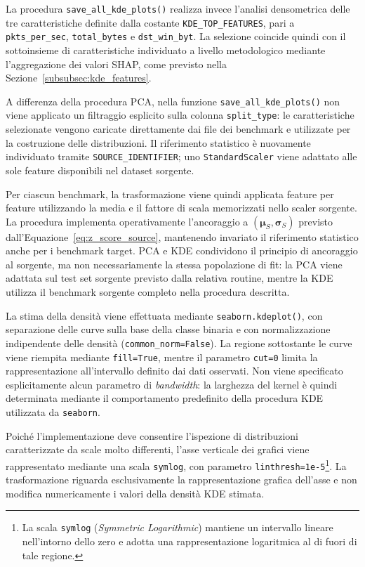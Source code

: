 La procedura \texttt{save\_all\_kde\_plots()} realizza invece l'analisi densometrica delle tre caratteristiche definite dalla costante \texttt{KDE\_TOP\_FEATURES}, pari a \texttt{pkts\_per\_sec}, \texttt{total\_bytes} e \texttt{dst\_win\_byt}. 
La selezione coincide quindi con il sottoinsieme di caratteristiche individuato a livello metodologico mediante l'aggregazione dei valori SHAP, come previsto nella Sezione~\ref{subsubsec:kde_features}.

A differenza della procedura PCA, nella funzione \texttt{save\_all\_kde\_plots()} non viene applicato un filtraggio esplicito sulla colonna \texttt{split\_type}: le caratteristiche selezionate vengono caricate direttamente dai file dei benchmark e utilizzate per la costruzione delle distribuzioni. 
Il riferimento statistico è nuovamente individuato tramite \texttt{SOURCE\_IDENTIFIER}; uno \texttt{StandardScaler} viene adattato alle sole feature disponibili nel dataset sorgente.

Per ciascun benchmark, la trasformazione viene quindi applicata feature per feature utilizzando la media e il fattore di scala memorizzati nello scaler sorgente. 
La procedura implementa operativamente l'ancoraggio a $(\boldsymbol{\mu}_S,\boldsymbol{\sigma}_S)$ previsto dall'Equazione~\eqref{eq:z_score_source}, mantenendo invariato il riferimento statistico anche per i benchmark target. PCA e KDE condividono il principio di ancoraggio al sorgente, ma non necessariamente la stessa popolazione di fit: la PCA viene adattata sul test set sorgente previsto dalla relativa routine, mentre la KDE utilizza il benchmark sorgente completo nella procedura descritta.

La stima della densità viene effettuata mediante \texttt{seaborn.kdeplot()}, con separazione delle curve sulla base della classe binaria e con normalizzazione indipendente delle densità \newline (\texttt{common\_norm=False}). 
La regione sottostante le curve viene riempita mediante \texttt{fill=True}, mentre il parametro \texttt{cut=0} limita la rappresentazione all'intervallo definito dai dati osservati. Non viene specificato esplicitamente alcun parametro di \textit{bandwidth}: la larghezza del kernel è quindi determinata mediante il comportamento predefinito della procedura KDE utilizzata da \texttt{seaborn}.

Poiché l'implementazione deve consentire l'ispezione di distribuzioni caratterizzate da scale molto differenti, l'asse verticale dei grafici viene rappresentato mediante una scala \texttt{symlog}, con parametro \texttt{linthresh=1e-5}\footnote{La scala \texttt{symlog} (\textit{Symmetric Logarithmic}) mantiene un intervallo lineare nell'intorno dello zero e adotta una rappresentazione logaritmica al di fuori di tale regione.}. La trasformazione riguarda esclusivamente la rappresentazione grafica dell'asse e non modifica numericamente i valori della densità KDE stimata.

